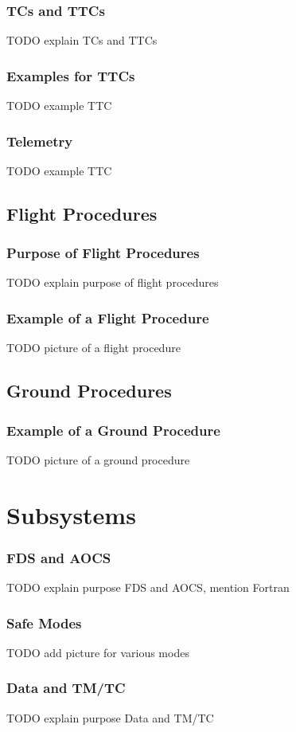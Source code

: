 \documentclass[12pt,utf8,notheorems,compress]{beamer}
\begin{document}
\begin{frame}
  \frametitle{TCs and TTCs}
  \pause
  TODO explain TCs and TTCs
\end{frame}

\begin{frame}
  \frametitle{Examples for TTCs}
  \pause
  TODO example TTC
\end{frame}

\begin{frame}
  \frametitle{Telemetry}
  \pause
  TODO example TTC
\end{frame}

\subsection{Flight Procedures}

\begin{frame}
  \frametitle{Purpose of Flight Procedures}
  \pause
  TODO explain purpose of flight procedures
\end{frame}

\begin{frame}
  \frametitle{Example of a Flight Procedure}
  \pause
  TODO picture of a flight procedure
\end{frame}

\subsection{Ground Procedures}

\begin{frame}
  \frametitle{Example of a Ground Procedure}
  \pause
  TODO picture of a ground procedure
\end{frame}

\section{Subsystems}

\begin{frame}
  \frametitle{FDS and AOCS}
  \pause
  TODO explain purpose FDS and AOCS, mention Fortran
\end{frame}

\begin{frame}
  \frametitle{Safe Modes}
  \pause
  TODO add picture for various modes
\end{frame}

\begin{frame}
  \frametitle{Data and TM/TC}
  \pause
  TODO explain purpose Data and TM/TC
\end{frame}
\end{document}
